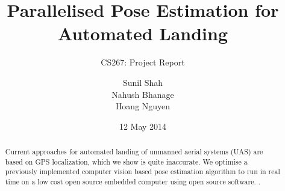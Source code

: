 \documentclass{acm_proc_article-sp}
\begin{document}
\title{Parallelised Pose Estimation for Automated Landing}
\subtitle{CS267: Project Report}
%
%
%
%
%

%
\author{
%
%
\alignauthor
Sunil Shah\\
\alignauthor
Nahush Bhanage\\
\alignauthor 
Hoang Nguyen\\
}

\date{12 May 2014}

\maketitle
\begin{abstract}
Current approaches for automated landing of unmanned aerial systems (UAS) are
based on GPS localization, which we show is quite inaccurate. We optimise a previously implemented computer vision based pose estimation algorithm to run in real time on a low cost open source embedded computer using open source software. .
\end{abstract}
\end{document}
